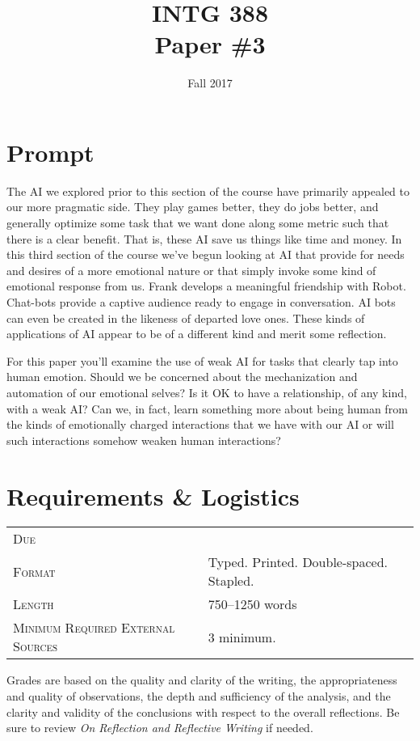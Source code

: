 \documentclass[nobib]{tufte-handout}
\title{INTG 388 \\ Paper \#3 }
\date{ Fall 2017 }
\begin{document}
\maketitle

\section{Prompt}

The AI we explored prior to this section of the course have primarily appealed to our more pragmatic side. They play games better, they do jobs better, and generally optimize some task that we want done along some metric such that there is a clear benefit. That is, these AI save us things like time and money. In this third section of the course we've begun looking at AI that provide for needs and desires of a more emotional nature or that simply invoke some kind of emotional response from us. Frank develops a meaningful friendship with Robot. Chat-bots provide a captive audience ready to engage in conversation.  AI bots can even be created in the likeness of departed love ones. These kinds of applications of AI appear to be of a different kind and merit some reflection.

For this paper you'll examine the use of weak AI for tasks that clearly tap into human emotion. Should we be concerned about the mechanization and automation of our emotional selves? Is it OK to have a relationship, of any kind, with a weak AI\@? Can we, in fact, learn something more about being human from the kinds of emotionally charged interactions that we have with our AI or will such interactions somehow weaken human interactions?


\section{Requirements \& Logistics}

\begin{tabular}{ll}
\textsc{Due} &  \\
\textsc{Format} & Typed. Printed. Double-spaced. Stapled. \\
\textsc{Length} & 750--1250 words \\
\textsc{Minimum Required External Sources} & 3 minimum.
\end{tabular}

Grades are based on the quality and clarity of the writing, the appropriateness and quality of observations, the depth and sufficiency of the analysis, and the clarity and validity of the conclusions with respect to the overall reflections. Be sure to review \textit{On Reflection and Reflective Writing} if needed.
\end{document}
